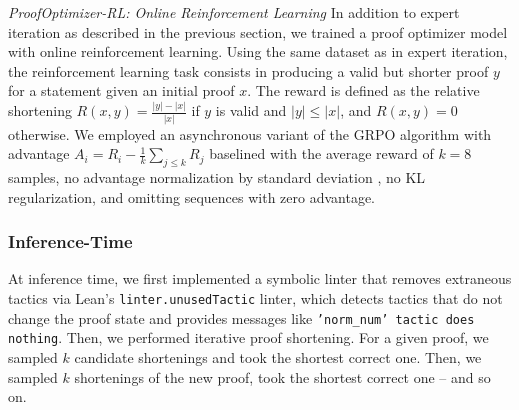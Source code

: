 \textit{ProofOptimizer-RL: Online Reinforcement Learning} \label{sec:rl}
In addition to expert iteration as described in the previous section, we trained a proof optimizer model with online reinforcement learning. Using the same dataset as in expert iteration, the reinforcement learning task consists in producing a valid but shorter proof $y$ for a statement given an initial proof $x$. The reward is defined as the relative shortening $R(x, y) = \frac{|y| - |x|}{|x|}$
if $y$ is valid and $|y| \leq |x|$, and $R(x, y) = 0$ otherwise. We employed an asynchronous variant of the GRPO algorithm \citep{shao2024grpo} with advantage $A_i = R_i - \frac{1}{k}\sum_{j \leq k} R_j$
baselined with the average reward of $k = 8$ samples, no advantage normalization by standard deviation \citep{liu2025understandingr1zeroliketrainingcritical}, no KL regularization, and omitting sequences with zero advantage.

\subsubsection{Inference-Time} \label{subsec:inference-time-algorithms}
At inference time, we first implemented a symbolic linter that removes extraneous tactics via Lean's \texttt{linter.\allowbreak{}unusedTactic} linter, which detects tactics that do not change the proof state and provides messages like \texttt{'norm\_num' tactic does nothing}.
Then, we performed iterative proof shortening. For a given proof, we sampled $k$ candidate shortenings and took the shortest correct one. Then, we sampled $k$ shortenings of the new proof, took the shortest correct one -- and so on.
